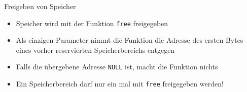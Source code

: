 \documentclass[presentation]{beamer}
\begin{document}
\begin{frame}[label={sec:org1f43d07},fragile]{Freigeben von Speicher}
 \begin{itemize}
\item Speicher wird mit der Funktion {\color{solarizedYellow}\verb!free!} freigegeben
\item Als einzigen Parameter nimmt die Funktion die Adresse des ersten
Bytes eines vorher reservierten Speicherbereichs entgegen
\item Falls die übergebene Adresse {\color{solarizedYellow}\verb!NULL!} ist, macht die Funktion nichts
\item Ein Speicherbereich darf nur ein mal mit {\color{solarizedYellow}\verb!free!} freigegeben werden!
\end{itemize}
\end{frame}
\end{document}
